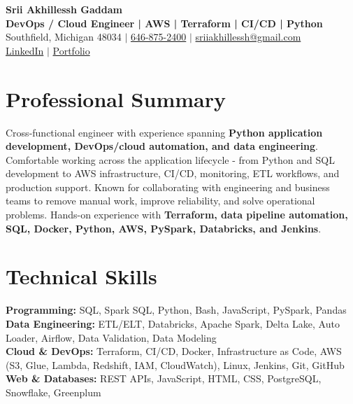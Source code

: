 \documentclass[letterpaper,10pt]{article}
\begin{document}
\fontsize{9.35pt}{10.45pt}\selectfont

\begin{center}
    {\LARGE \textbf{Srii Akhillessh Gaddam}} \\[-1pt]
    \textbf{DevOps / Cloud Engineer | AWS | Terraform | CI/CD | Python} \\[2pt]
    Southfield, Michigan 48034 $|$
    \href{tel:6468752400}{646-875-2400} $|$
    \href{mailto:sriiakhillessh@gmail.com}{sriiakhillessh@gmail.com} \\[1pt]
    \href{https://www.linkedin.com/in/srii-akhiilessh-gaddam-b48668191/}{LinkedIn} $|$
    \href{https://sriiakhillesshg.github.io/portfolio/}{Portfolio}
\end{center}
\vspace{-8pt}

\section{Professional Summary}
\small{Cross-functional engineer with experience spanning \textbf{Python application development, DevOps/cloud automation, and data engineering}. Comfortable working across the application lifecycle - from Python and SQL development to AWS infrastructure, CI/CD, monitoring, ETL workflows, and production support. Known for collaborating with engineering and business teams to remove manual work, improve reliability, and solve operational problems. Hands-on experience with \textbf{Terraform, data pipeline automation, SQL, Docker, Python, AWS, PySpark, Databricks, and Jenkins}.}

\section{Technical Skills}
\small{
\textbf{Programming:} SQL, Spark SQL, Python, Bash, JavaScript, PySpark, Pandas \\
\textbf{Data Engineering:} ETL/ELT, Databricks, Apache Spark, Delta Lake, Auto Loader, Airflow, Data Validation, Data Modeling \\
\textbf{Cloud \& DevOps:} Terraform, CI/CD, Docker, Infrastructure as Code, AWS (S3, Glue, Lambda, Redshift, IAM, CloudWatch), Linux, Jenkins, Git, GitHub \\
\textbf{Web \& Databases:} REST APIs, JavaScript, HTML, CSS, PostgreSQL, Snowflake, Greenplum
}
\end{document}
